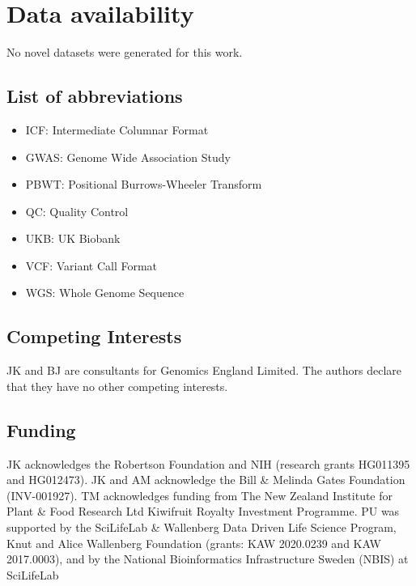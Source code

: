 \documentclass[a4paper,num-refs]{oup-contemporary}
\begin{document}
\section{Data availability}
 
No novel datasets were generated for this work.

\subsection{List of abbreviations}

\begin{itemize}
    \item ICF: Intermediate Columnar Format
    \item GWAS: Genome Wide Association Study
    \item PBWT: Positional Burrows-Wheeler Transform
    \item QC: Quality Control
    \item UKB: UK Biobank
    \item VCF: Variant Call Format
    \item WGS: Whole Genome Sequence
\end{itemize}

\subsection{Competing Interests}
JK and BJ are consultants for Genomics England Limited.
The authors declare that they have no other competing interests.

\subsection{Funding}
JK acknowledges the Robertson Foundation and
NIH (research grants HG011395 and HG012473).
JK and AM acknowledge the Bill \& Melinda Gates Foundation (INV-001927).
TM acknowledges funding from The New Zealand Institute for Plant \& Food
Research Ltd Kiwifruit Royalty Investment Programme.
PU was supported by the SciLifeLab \& Wallenberg Data Driven Life
Science Program, Knut and Alice Wallenberg Foundation (grants: KAW
2020.0239 and KAW 2017.0003), and by the National Bioinformatics
Infrastructure Sweden (NBIS) at SciLifeLab
\end{document}
